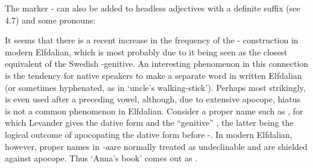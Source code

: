 {{
\z 

\z

The marker\textit{ {}-} can also be added to headless adjectives with a definite suffix (see 4.7) and some pronouns:


\ea\label{}


\z 
\z

It seems that there is a recent increase in the frequency of the \nobreakdash- construction in modern Elfdalian, which is most probably due to it being seen as the closest equivalent of the Swedish -genitive. An interesting phenomenon in this connection is the tendency for native speakers to make  a separate word in written Elfdalian (or sometimes hyphenated, as in  ‘uncle’s walking-stick’). Perhaps most strikingly,  is even used after a preceding vowel, although, due to extensive apocope, hiatus is not a common phenomenon in Elfdalian. Consider a proper name such as , for which Levander gives the dative form  and the “genitive” , the latter being the logical outcome of apocopating the dative form before {}-. In modern Elfdalian, however, proper names in\textit{ {}-a}\textstyleLinguisticExample{ }are normally treated as undeclinable and are shielded against apocope. Thus ‘Anna’s book’ comes out as . 

}}
